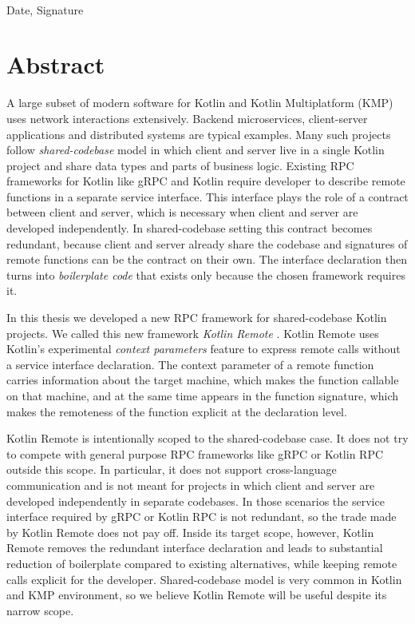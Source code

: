 \documentclass[a4paper,11pt,oneside]{article}
\newcommand{\term}[1]{\textit{#1}}
\begin{document}
\vspace{20mm}

\dotfill\\
Date, Signature

\newpage

\section*{Abstract}

A large subset of modern software for Kotlin and Kotlin Multiplatform (KMP) uses network
interactions extensively. Backend microservices, client-server applications and distributed
systems are typical examples. Many such projects follow \term{shared-codebase} model in which client and server live in a single Kotlin project and share
data types and parts of business logic. Existing RPC frameworks for Kotlin like gRPC and Kotlin
require developer to describe remote
functions in a separate service interface. This interface plays the role of a contract between
client and server, which is necessary when client and server are developed independently. In
shared-codebase setting this contract becomes redundant, because client and server already share
the codebase and signatures of remote functions can be the contract on their own. The interface
declaration then turns into \term{boilerplate code} that exists only because the chosen framework
requires it.

In this thesis we developed a new RPC framework for shared-codebase Kotlin projects. We called
this new framework \term{Kotlin Remote} \cite{enotvtapke_kotlin-remote_2026}. Kotlin Remote uses
Kotlin's experimental \term{context parameters} feature to express remote calls without a service
interface declaration. The context parameter of a remote function carries information about the
target machine, which makes the function callable on that machine, and at the same time appears
in the function signature, which makes the remoteness of the function explicit at the
declaration level.

Kotlin Remote is intentionally scoped to the shared-codebase case. It does not try to compete
with general purpose RPC frameworks like gRPC or Kotlin RPC outside this scope. In particular,
it does not support cross-language communication and is not meant for projects in which client
and server are developed independently in separate codebases. In those scenarios the service
interface required by gRPC or Kotlin RPC is not redundant, so the trade made by Kotlin Remote
does not pay off. Inside its target scope, however, Kotlin Remote removes the redundant interface
declaration and leads to substantial reduction of boilerplate compared to existing alternatives,
while keeping remote calls explicit for the developer. Shared-codebase model is very common
in Kotlin and KMP environment, so we believe Kotlin Remote will be useful despite its narrow
scope.
\end{document}
